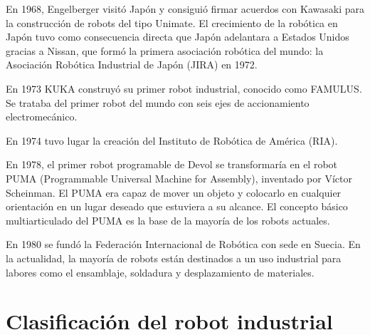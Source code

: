 \documentclass[12pt,a4paper]{report}
\begin{document}
En 1968, Engelberger visitó Japón y consiguió firmar acuerdos con Kawasaki para
la construcción de robots del tipo Unimate. El crecimiento de la robótica en
Japón tuvo como consecuencia directa que Japón adelantara a Estados Unidos
gracias a Nissan, que formó la primera asociación robótica del mundo: la
Asociación Robótica Industrial de Japón (JIRA) en 1972. 

En 1973 KUKA construyó su primer robot industrial, conocido como FAMULUS. Se
trataba del primer robot del mundo con seis ejes de accionamiento
electromecánico.

En 1974 tuvo lugar la creación del Instituto de
Robótica de América (RIA).

En 1978, el primer robot programable de Devol se transformaría en el robot PUMA
(Programmable Universal Machine for Assembly), inventado por Víctor Scheinman. El PUMA era capaz de mover un
objeto y colocarlo en cualquier orientación en un lugar deseado que estuviera a
su alcance. El concepto básico multiarticulado del PUMA es la base de la mayoría
de los robots actuales.

En 1980 se fundó la Federación Internacional de Robótica con sede en Suecia.
En la actualidad, la mayoría de robots están destinados a un uso industrial para
labores como el ensamblaje, soldadura y desplazamiento de materiales.

\section{Clasificación del robot industrial}
\end{document}
